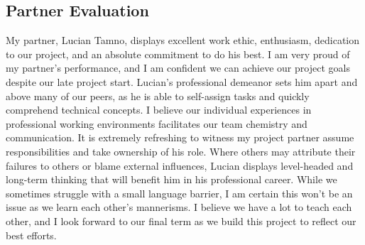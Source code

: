 \documentclass[onecolumn, draftclsnofoot,10pt, compsoc]{IEEEtran}
\begin{document}
\begin{singlespace}
	\subsection{Partner Evaluation}
		My partner, Lucian Tamno, displays excellent work ethic, enthusiasm, dedication to our project, and an absolute commitment to do his best.
		I am very proud of my partner's performance, and I am confident we can achieve our project goals despite our late project start.
		Lucian's professional demeanor sets him apart and above many of our peers, as he is able to self-assign tasks and quickly comprehend technical concepts.
		I believe our individual experiences in professional working environments facilitates our team chemistry and communication.
		It is extremely refreshing to witness my project partner assume responsibilities and take ownership of his role.
		Where others may attribute their failures to others or blame external influences, Lucian displays level-headed and long-term thinking that will benefit him in his professional career.
		While we sometimes struggle with a small language barrier, I am certain this won't be an issue as we learn each other's mannerisms.
		I believe we have a lot to teach each other, and I look forward to our final term as we build this project to reflect our best efforts.
		
\end{singlespace}
\end{document}
